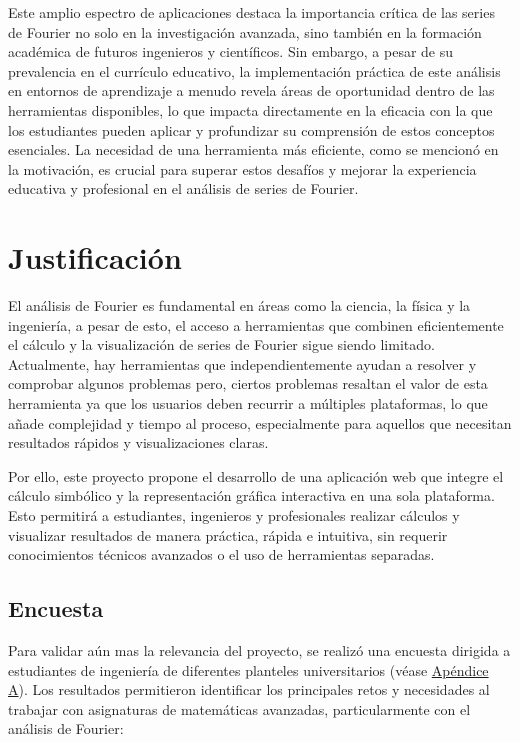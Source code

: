 Este amplio espectro de aplicaciones destaca la importancia crítica de las series de Fourier no solo en la investigación avanzada, sino también en la formación académica de futuros ingenieros y científicos. Sin embargo, a pesar de su prevalencia en el currículo educativo, la implementación práctica de este análisis en entornos de aprendizaje a menudo revela áreas de oportunidad dentro de las herramientas disponibles, lo que impacta directamente en la eficacia con la que los estudiantes pueden aplicar y profundizar su comprensión de estos conceptos esenciales. La necesidad de una herramienta más eficiente, como se mencionó en la motivación, es crucial para superar estos desafíos y mejorar la experiencia educativa y profesional en el análisis de series de Fourier.

\section{Justificación}
El análisis de Fourier es fundamental en áreas como la ciencia, la física y la ingeniería, a pesar de esto, el acceso a herramientas que combinen eficientemente el cálculo y la visualización de series de Fourier sigue siendo limitado. Actualmente, hay herramientas que independientemente ayudan a resolver y comprobar algunos problemas pero, ciertos problemas resaltan el valor de esta herramienta ya que los usuarios deben recurrir a múltiples plataformas, lo que añade complejidad y tiempo al proceso, especialmente para aquellos que necesitan resultados rápidos y visualizaciones claras.

Por ello, este proyecto propone el desarrollo de una aplicación web que integre el cálculo simbólico y la representación gráfica interactiva en una sola plataforma. Esto permitirá a estudiantes, ingenieros y profesionales realizar cálculos y visualizar resultados de manera práctica, rápida e intuitiva, sin requerir conocimientos técnicos avanzados o el uso de herramientas separadas. 

\subsection{Encuesta}
Para validar aún mas la relevancia del proyecto, se realizó una encuesta dirigida a estudiantes de ingeniería de diferentes planteles universitarios (véase \hyperref[app1:Encuesta]{Apéndice A}). Los resultados permitieron identificar los principales retos y necesidades al trabajar con asignaturas de matemáticas avanzadas, particularmente con el análisis de Fourier:

